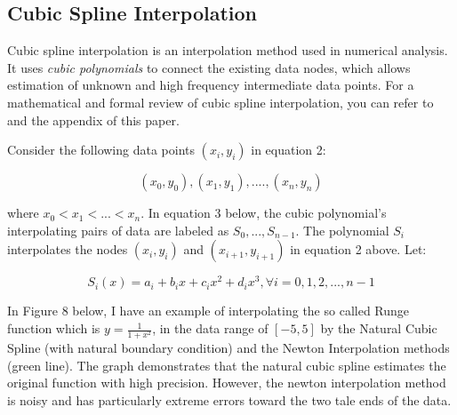 \documentclass[12pt]{article}
\newcommand{\1}{\mathbbm 1}
\begin{document}
		
		\subsection{Cubic Spline Interpolation}
		
		Cubic spline interpolation is an interpolation method used in numerical analysis. It uses \textit{cubic polynomials} to connect the existing data nodes, which allows estimation of unknown and high frequency intermediate data points. For a mathematical and formal review of cubic spline interpolation, you can refer to \cite{burden2015numerical} and the appendix of this paper.
		
		Consider the following data points $(x_{i}, y_{i})$ in equation 2:
		
		\begin{equation}
			(x_{0}, y_{0}), (x_{1}, y_{1}), .... , (x_{n}, y_{n})
		\end{equation}
		
		
		where $x_{0} < x_{1} < ... < x_{n}$. In equation 3 below, the cubic polynomial's interpolating pairs of data are labeled as $S_{0},..., S_{n-1}$. The polynomial $S_{i}$ interpolates the nodes $(x_{i}, y_{i})$ and $(x_{i+1}, y_{i+1})$ in equation 2 above. Let:
		
		
		\begin{equation}
			S_{i}(x) = a_{i} + b_{i}x + c_{i}x^{2} + d_{i}x^{3}, \forall i = 0, 1, 2, ... ,n-1
		\end{equation}
		
		
		
		In Figure 8 below, I have an example of interpolating the so called Runge function which is $y = \frac{1}{1 + x^{2}}$, in the data range of $[-5, 5]$ by the Natural Cubic Spline (with natural boundary condition) and the Newton Interpolation methods (green line). The graph demonstrates that the natural cubic spline estimates the original function with high precision. However, the newton interpolation method is noisy and has particularly extreme errors toward the two tale ends of the data.
		
\end{document}

